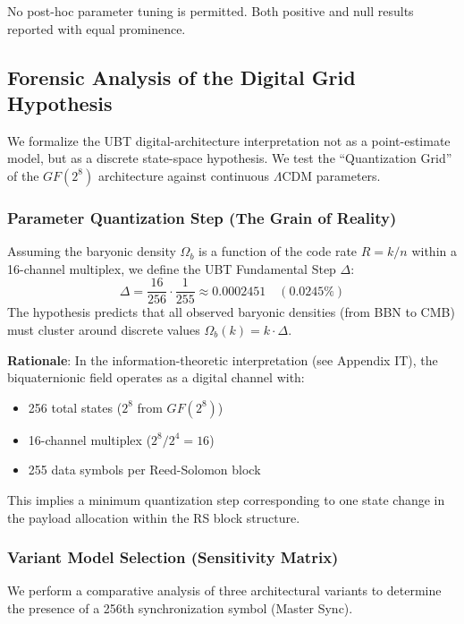 No post-hoc parameter tuning is permitted. Both positive and null results reported with equal prominence.

\subsection{Forensic Analysis of the Digital Grid Hypothesis}
\label{subsec:digital_grid_forensic}

We formalize the UBT digital-architecture interpretation not as a point-estimate model, but as a discrete state-space hypothesis. We test the ``Quantization Grid'' of the $GF(2^8)$ architecture against continuous $\Lambda$CDM parameters.

\subsubsection{Parameter Quantization Step (The Grain of Reality)}

Assuming the baryonic density $\Omega_b$ is a function of the code rate $R = k/n$ within a 16-channel multiplex, we define the UBT Fundamental Step $\Delta$:
\begin{equation}
\Delta = \frac{16}{256} \cdot \frac{1}{255} \approx 0.0002451 \quad (0.0245\%)
\end{equation}
The hypothesis predicts that all observed baryonic densities (from BBN to CMB) must cluster around discrete values $\Omega_b(k) = k \cdot \Delta$.

\textbf{Rationale}: In the information-theoretic interpretation (see Appendix IT), the biquaternionic field operates as a digital channel with:
\begin{itemize}
    \item 256 total states ($2^8$ from $GF(2^8)$)
    \item 16-channel multiplex ($2^8 / 2^4 = 16$)
    \item 255 data symbols per Reed-Solomon block
\end{itemize}

This implies a minimum quantization step corresponding to one state change in the payload allocation within the RS block structure.

\subsubsection{Variant Model Selection (Sensitivity Matrix)}

We perform a comparative analysis of three architectural variants to determine the presence of a 256th synchronization symbol (Master Sync).

